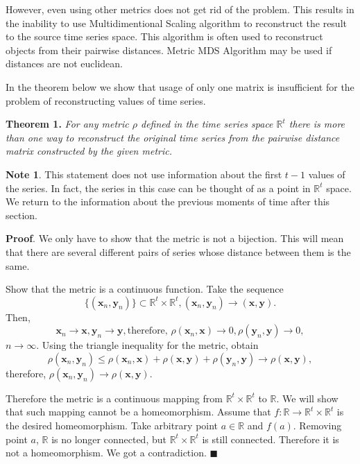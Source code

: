 \documentclass[12pt]{article}
\begin{document}
However, even using other metrics does not get rid of the problem. This results in the inability to use Multidimentional Scaling algorithm to reconstruct the result to the source time series space. This algorithm is often used to reconstruct objects from their pairwise distances. Metric MDS Algorithm may be used if distances are not euclidean.

In the theorem below we show that usage of only one matrix is insufficient for the problem of reconstructing values of time series.

\textbf{Theorem 1.} \emph{For any metric $\rho$ defined in the time series space $\mathbb{R}^t$ there is more than one way to reconstruct the original time series from the pairwise distance matrix constructed by the given metric.}	

\textbf{Note 1}. This statement does not use information about the first $t-1$ values of the series. In fact, the series in this case can be thought of as a point in $\mathbb{R}^t$ space. We return to the information about the previous moments of time after this section.

\textbf{Proof}. We only have to show that the metric is not a bijection. This will mean that there are several different pairs of series whose distance between them is the same.

Show that the metric is a continuous function. Take the sequence \[\{(\mathbf{x}_n, \mathbf{y}_n)\} \subset \mathbb{R}^t \times \mathbb{R}^t, (\mathbf{x}_n, \mathbf{y}_n) \to (\mathbf{x}, \mathbf{y}).\] Then, \[\mathbf{x}_n\to \mathbf{x}, \mathbf{y}_n\to \mathbf{y}, \text{therefore, } \rho(\mathbf{x}_n,\mathbf{x})\to 0 ,\rho(\mathbf{y}_n,\mathbf{y})\to 0,\] $n \to \infty.$ Using the triangle inequality for the metric, obtain \[\rho(\mathbf{x}_n,\mathbf{y}_n)\leqslant \rho(\mathbf{x}_n,\mathbf{x})+\rho(\mathbf{x},\mathbf{y})+\rho(\mathbf{y}_n,\mathbf{y})\to \rho(\mathbf{x},\mathbf{y}),\] therefore, $\rho(\mathbf{x}_n,\mathbf{y}_n)\to \rho(\mathbf{x},\mathbf{y})$.

Therefore the metric is a continuous mapping from $\mathbb{R}^t \times \mathbb{R}^t$ to $\mathbb{R}$. We will show that such mapping cannot be a homeomorphism. Assume that $f: \mathbb{R} \to \mathbb{R}^t \times \mathbb{R}^t$ is the desired homeomorphism. Take arbitrary point $a \in \mathbb{R}$ and $f(a)$. Removing point $a$, $\mathbb{R}$ is no longer connected, but $\mathbb{R}^t \times \mathbb{R}^t$ is still connected. Therefore it is not a homeomorphism. We got a contradiction. \hfill$\blacksquare$
\end{document}
